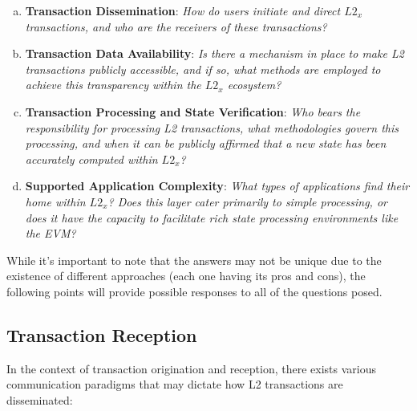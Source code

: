 \begin{enumerate}[(a)]

\item \textbf{Transaction Dissemination}: \textit{How do users initiate and direct $L2_x$ transactions, and who are the receivers of these transactions?}

\item \textbf{Transaction Data Availability}: \textit{Is there a mechanism in place to make L2 transactions publicly accessible, and if so, what methods are employed to achieve this transparency within the $L2_x$ ecosystem?}

\item \textbf{Transaction Processing and State Verification}: \textit{Who bears the responsibility for processing L2 transactions, what methodologies govern this processing, and when it can be publicly affirmed that a new state has been accurately computed within $L2_x$?}

\item \textbf{Supported Application Complexity}: \textit{What types of applications find their home within $L2_x$? Does this layer cater primarily to simple processing, or does it have the capacity to facilitate rich state processing environments like the EVM?}

\end{enumerate}

While it's important to note that the answers may not be unique due to the existence of different approaches (each one having its pros and cons), the following points will provide possible responses to all of the questions posed.

\subsection{Transaction Reception}

In the context of transaction origination and reception, there exists various communication paradigms that may dictate how L2 transactions are disseminated:


